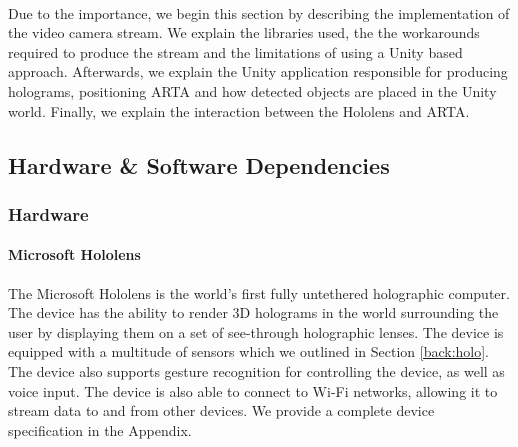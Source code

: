 \paragraph{} Due to the importance, we begin this section by describing the implementation of the video camera stream. We explain the libraries used, the the workarounds required to produce the stream and the limitations of using a Unity based approach. Afterwards, we explain the Unity application responsible for producing holograms, positioning ARTA and how detected objects are placed in the Unity world. Finally, we explain the interaction between the Hololens and ARTA.

\subsection{Hardware \& Software Dependencies}
\subsubsection{Hardware}
\paragraph{Microsoft Hololens} The Microsoft Hololens is the world's first fully untethered holographic computer. The device has the ability to render 3D holograms in the world surrounding the user by displaying them on a set of see-through holographic lenses. The device is equipped with a multitude of sensors which we outlined in Section \ref{back:holo}. The device also supports gesture recognition for controlling the device, as well as voice input. The device is also able to connect to Wi-Fi networks, allowing it to stream data to and from other devices. We provide a complete device specification in the Appendix.

